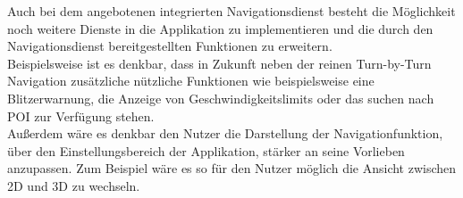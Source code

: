 Auch bei dem angebotenen integrierten Navigationsdienst besteht die Möglichkeit noch weitere Dienste in die Applikation zu implementieren und die durch den Navigationsdienst bereitgestellten Funktionen zu erweitern.\\
Beispielsweise ist es denkbar, dass in Zukunft neben der reinen Turn-by-Turn Navigation zusätzliche nützliche Funktionen wie beispielsweise eine Blitzerwarnung, die Anzeige von Geschwindigkeitslimits oder das suchen nach \ac{POI} zur Verfügung stehen.\\
Außerdem wäre es denkbar den Nutzer die Darstellung der Navigationfunktion, über den Einstellungsbereich der Applikation, stärker an seine Vorlieben anzupassen. Zum Beispiel wäre es so für den Nutzer möglich die Ansicht zwischen 2D und 3D zu wechseln.
